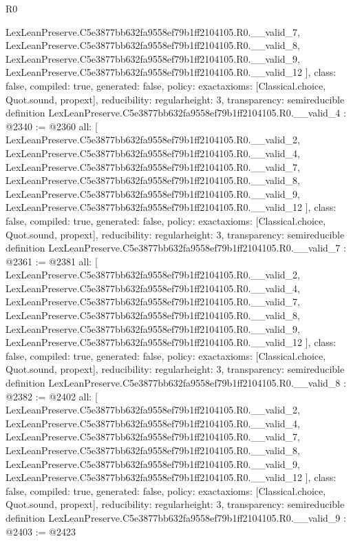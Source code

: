 \begin{lexlean}{R0}
\begin{coremodule}
{    LexLeanPreserve.C5e3877bb632fa9558ef79b1ff2104105.R0.__valid_7,
    LexLeanPreserve.C5e3877bb632fa9558ef79b1ff2104105.R0.__valid_8,
    LexLeanPreserve.C5e3877bb632fa9558ef79b1ff2104105.R0.__valid_9,
    LexLeanPreserve.C5e3877bb632fa9558ef79b1ff2104105.R0.__valid_12
  ],
  class: false,
  compiled: true,
  generated: false,
  policy: exact{axioms: [Classical.choice, Quot.sound, propext]},
  reducibility: regular{height: 3},
  transparency: semireducible
}
definition LexLeanPreserve.C5e3877bb632fa9558ef79b1ff2104105.R0.__valid_4 : @2340 := @2360 {
  all: [
    LexLeanPreserve.C5e3877bb632fa9558ef79b1ff2104105.R0.__valid_2,
    LexLeanPreserve.C5e3877bb632fa9558ef79b1ff2104105.R0.__valid_4,
    LexLeanPreserve.C5e3877bb632fa9558ef79b1ff2104105.R0.__valid_7,
    LexLeanPreserve.C5e3877bb632fa9558ef79b1ff2104105.R0.__valid_8,
    LexLeanPreserve.C5e3877bb632fa9558ef79b1ff2104105.R0.__valid_9,
    LexLeanPreserve.C5e3877bb632fa9558ef79b1ff2104105.R0.__valid_12
  ],
  class: false,
  compiled: true,
  generated: false,
  policy: exact{axioms: [Classical.choice, Quot.sound, propext]},
  reducibility: regular{height: 3},
  transparency: semireducible
}
definition LexLeanPreserve.C5e3877bb632fa9558ef79b1ff2104105.R0.__valid_7 : @2361 := @2381 {
  all: [
    LexLeanPreserve.C5e3877bb632fa9558ef79b1ff2104105.R0.__valid_2,
    LexLeanPreserve.C5e3877bb632fa9558ef79b1ff2104105.R0.__valid_4,
    LexLeanPreserve.C5e3877bb632fa9558ef79b1ff2104105.R0.__valid_7,
    LexLeanPreserve.C5e3877bb632fa9558ef79b1ff2104105.R0.__valid_8,
    LexLeanPreserve.C5e3877bb632fa9558ef79b1ff2104105.R0.__valid_9,
    LexLeanPreserve.C5e3877bb632fa9558ef79b1ff2104105.R0.__valid_12
  ],
  class: false,
  compiled: true,
  generated: false,
  policy: exact{axioms: [Classical.choice, Quot.sound, propext]},
  reducibility: regular{height: 3},
  transparency: semireducible
}
definition LexLeanPreserve.C5e3877bb632fa9558ef79b1ff2104105.R0.__valid_8 : @2382 := @2402 {
  all: [
    LexLeanPreserve.C5e3877bb632fa9558ef79b1ff2104105.R0.__valid_2,
    LexLeanPreserve.C5e3877bb632fa9558ef79b1ff2104105.R0.__valid_4,
    LexLeanPreserve.C5e3877bb632fa9558ef79b1ff2104105.R0.__valid_7,
    LexLeanPreserve.C5e3877bb632fa9558ef79b1ff2104105.R0.__valid_8,
    LexLeanPreserve.C5e3877bb632fa9558ef79b1ff2104105.R0.__valid_9,
    LexLeanPreserve.C5e3877bb632fa9558ef79b1ff2104105.R0.__valid_12
  ],
  class: false,
  compiled: true,
  generated: false,
  policy: exact{axioms: [Classical.choice, Quot.sound, propext]},
  reducibility: regular{height: 3},
  transparency: semireducible
}
definition LexLeanPreserve.C5e3877bb632fa9558ef79b1ff2104105.R0.__valid_9 : @2403 := @2423 {
}
\end{coremodule}
\end{lexlean}
